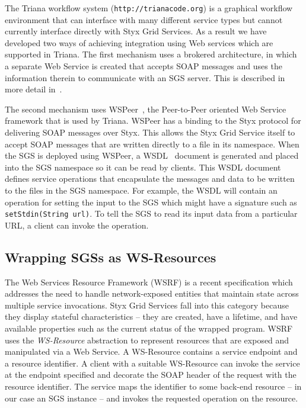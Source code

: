\documentclass[a4paper]{article}
\begin{document}
The Triana workflow system (\texttt{http://trianacode.org}) is a graphical workflow environment that can interface with many different service types but cannot currently interface directly with Styx Grid Services.  As a result we have developed two ways of achieving integration using Web services which are supported in Triana. The first mechanism uses a brokered architecture, in which a separate Web Service is created that accepts SOAP messages and uses the information therein to communicate with an SGS server. This is described in more detail in~\cite{blower:2005}.

The second mechanism uses WSPeer~\cite{wspeer}, the Peer-to-Peer oriented Web Service framework that is used by Triana. WSPeer has a binding to the Styx protocol for delivering SOAP messages over Styx. This allows the Styx Grid Service itself to accept SOAP messages that are written directly to a file in its namespace.  When the SGS is deployed using WSPeer, a WSDL~\cite{WSDL} document is generated and placed into the SGS namespace so it can be read by clients. This WSDL document defines service operations that encapsulate the messages and data to be written to the files in the SGS namespace. For example, the WSDL will contain an operation for setting the input to the SGS which might have a signature such as  \texttt{setStdin(String url)}. To tell the SGS to read its input data from a particular URL, a client can invoke the operation. 

\subsection{Wrapping SGSs as WS-Resources}\label{subsec:ws-resources}

The Web Services Resource Framework (WSRF) is a recent specification which addresses the need to handle network-exposed entities that maintain state across multiple service invocations. Styx Grid Services fall into this category because they display stateful characteristics -- they are created, have a lifetime, and have available properties such as the current status of the wrapped program. WSRF uses the \textit{WS-Resource} abstraction to represent resources that are exposed and manipulated via a Web Service. A WS-Resource contains a service endpoint and a resource identifier. A client with a suitable WS-Resource can invoke the service at the endpoint specified and decorate the SOAP header of the request with the resource identifier. The service maps the identifier to some back-end resource -- in our case an SGS instance -- and invokes the requested operation on the resource.
\end{document}
